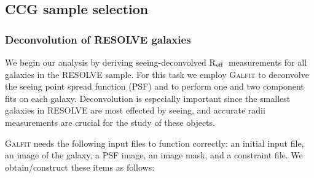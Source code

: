\documentclass[iop,apj]{emulateapj}
\newcommand{\Reff}{R$_{\rm eff}$}
\begin{document}
\subsection{CCG sample selection}

\subsubsection{Deconvolution of RESOLVE galaxies}
\label{deconv}

\noindent We begin our analysis by deriving seeing-deconvolved \Reff\ measurements for all galaxies in the RESOLVE sample. For this task we employ \textsc{Galfit} \citep{Peng2002} to deconvolve the seeing point spread function (PSF) and to perform one and two component fits on each galaxy. Deconvolution is especially important since the smallest galaxies in RESOLVE are most effected by seeing, and accurate radii measurements are crucial for the study of these objects. 

\textsc{Galfit} needs the following input files to function correctly: an initial input file, an image of the galaxy, a PSF image, an image mask, and a constraint file. We obtain/construct these items as follows:
\end{document}

